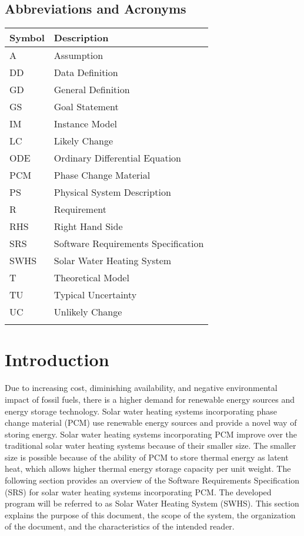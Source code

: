 \documentclass[12pt]{article}
\begin{document}
\subsection{Abbreviations and Acronyms}
\label{Sec:TAbbAcc}
\begin{longtable*}{l l}
\toprule
Symbol & Description
\\
\midrule
A & Assumption
\\
DD & Data Definition
\\
GD & General Definition
\\
GS & Goal Statement
\\
IM & Instance Model
\\
LC & Likely Change
\\
ODE & Ordinary Differential Equation
\\
PCM & Phase Change Material
\\
PS & Physical System Description
\\
R & Requirement
\\
RHS & Right Hand Side
\\
SRS & Software Requirements Specification
\\
SWHS & Solar Water Heating System
\\
T & Theoretical Model
\\
TU & Typical Uncertainty
\\
UC & Unlikely Change
\\
\bottomrule
\label{Table:TAbbAcc}
\end{longtable*}
\section{Introduction}
\label{Sec:Intro}
Due to increasing cost, diminishing availability, and negative environmental impact of fossil fuels, there is a higher demand for renewable energy sources and energy storage technology. Solar water heating systems incorporating phase change material (PCM) use renewable energy sources and provide a novel way of storing energy. Solar water heating systems incorporating PCM improve over the traditional solar water heating systems because of their smaller size. The smaller size is possible because of the ability of PCM to store thermal energy as latent heat, which allows higher thermal energy storage capacity per unit weight.
The following section provides an overview of the Software Requirements Specification (SRS) for solar water heating systems incorporating PCM. The developed program will be referred to as Solar Water Heating System (SWHS). This section explains the purpose of this document, the scope of the system, the organization of the document, and the characteristics of the intended reader.
\end{document}
